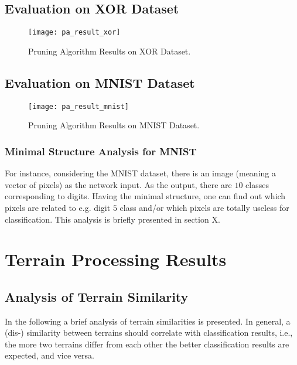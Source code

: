 \subsection{Evaluation on XOR Dataset} \label{ssec:evaluation_on_xor}

\begin{figure}[H]
  \centering
  \texttt{[image: pa\_result\_xor]}
  \caption{Pruning Algorithm Results on XOR Dataset.}
  \label{fig:pa_result_xor}
\end{figure}

\subsection{Evaluation on MNIST Dataset} \label{ssec:evaluation_on_mnist}

\begin{figure}[H]
  \centering
  \texttt{[image: pa\_result\_mnist]}
  \caption{Pruning Algorithm Results on MNIST Dataset.}
  \label{fig:pa_result_mnist}
\end{figure}

\subsubsection{Minimal Structure Analysis for MNIST} \label{sssec:mnist_analysis}
For instance, considering the MNIST dataset, there is an image (meaning a vector of pixels) as the network input. As the output, there are $ 10 $ classes corresponding to digits. Having the minimal structure, one can find out which pixels are related to e.g. digit $ 5 $ class and/or which pixels are totally useless for classification. This analysis is briefly presented in section X.

\section{Terrain Processing Results} \label{sec:terrain_processing_results}

\subsection{Analysis of Terrain Similarity} \label{ssec:terrains_analysis}
In the following a brief analysis of terrain similarities is presented. In general, a (dis-) similarity between terrains should correlate with classification results, i.e., the more two terrains differ from each other the better classification results are expected, and vice versa.

